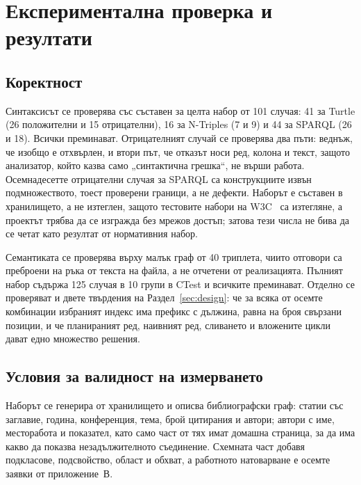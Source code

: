\section{Експериментална проверка и резултати}
\label{sec:method}
\label{sec:results}

\subsection{Коректност}

Синтаксисът се проверява със съставен за целта набор от 101 случая: 41 за Turtle (26
положителни и 15 отрицателни), 16 за N-Triples (7 и 9) и 44 за SPARQL (26 и 18). Всички
преминават. Отрицателният случай се проверява два пъти: веднъж, че изобщо е отхвърлен, и втори
път, че отказът носи ред, колона и текст, защото анализатор, който казва само „синтактична
грешка“, не върши работа. Осемнадесетте отрицателни случая за SPARQL са конструкциите извън
подмножеството, тоест проверени граници, а не дефекти. Наборът е съставен в хранилището, а не
изтеглен, защото тестовите набори на W3C~\cite{w3c_sparql11_testsuite} са изтегляне, а проектът
трябва да се изгражда без мрежов достъп; затова тези числа не бива да се четат като резултат от
нормативния набор.

Семантиката се проверява върху малък граф от 40 триплета, чиито отговори са преброени на ръка
от текста на файла, а не отчетени от реализацията. Пълният набор съдържа 125 случая в 10 групи
в CTest и всичките преминават. Отделно се проверяват и двете твърдения на
Раздел~\ref{sec:design}: че за всяка от осемте комбинации избраният индекс има префикс с
дължина, равна на броя свързани позиции, и че планираният ред, наивният ред, сливането и
вложените цикли дават едно множество решения.

\subsection{Условия за валидност на измерването}

Наборът се генерира от хранилището и описва библиографски граф: статии със заглавие, година,
конференция, тема, брой цитирания и автори; автори с име, месторабота и показател, като само
част от тях имат домашна страница, за да има какво да показва незадължителното съединение.
Схемната част добавя подкласове, подсвойство, област и обхват, а работното натоварване е осемте
заявки от приложение~В.

